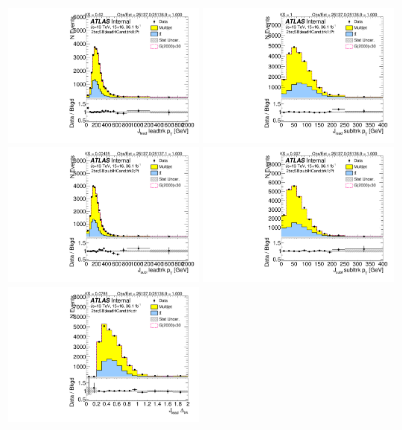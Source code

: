 \begin{figure}[htbp!]
\begin{center}
\includegraphics[width=0.45\textwidth,angle=-90]{figures/boosted/Sideband/b77_TwoTag_split_Sideband_leadHCand_trk0_Pt.pdf}
\includegraphics[width=0.45\textwidth,angle=-90]{figures/boosted/Sideband/b77_TwoTag_split_Sideband_leadHCand_trk1_Pt.pdf}\\
\includegraphics[width=0.45\textwidth,angle=-90]{figures/boosted/Sideband/b77_TwoTag_split_Sideband_sublHCand_trk0_Pt.pdf}
\includegraphics[width=0.45\textwidth,angle=-90]{figures/boosted/Sideband/b77_TwoTag_split_Sideband_sublHCand_trk1_Pt.pdf}\\
\includegraphics[width=0.45\textwidth,angle=-90]{figures/boosted/Sideband/b77_TwoTag_split_Sideband_leadHCand_trk_dr.pdf}

\end{center}
\end{figure}
